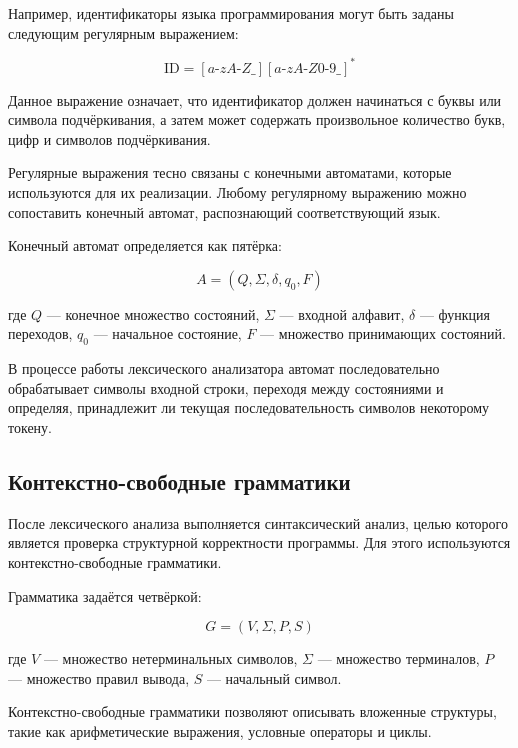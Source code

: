 \documentclass[coursework]{SCWorks}
\begin{document}
Например, идентификаторы языка программирования могут быть заданы следующим регулярным выражением:

\begin{equation}
\text{ID} = [a\text{-}zA\text{-}Z\_][a\text{-}zA\text{-}Z0\text{-}9\_]^*
\label{eq:id}
\end{equation}

Данное выражение означает, что идентификатор должен начинаться с буквы или символа подчёркивания, 
а затем может содержать произвольное количество букв, цифр и символов подчёркивания.

Регулярные выражения тесно связаны с конечными автоматами, которые используются для их реализации. 
Любому регулярному выражению можно сопоставить конечный автомат, распознающий соответствующий язык.

Конечный автомат определяется как пятёрка:

\begin{equation}
A = (Q, \Sigma, \delta, q_0, F)
\label{eq:automaton}
\end{equation}

где $Q$ — конечное множество состояний, $\Sigma$ — входной алфавит, 
$\delta$ — функция переходов, $q_0$ — начальное состояние, 
$F$ — множество принимающих состояний.

В процессе работы лексического анализатора автомат последовательно обрабатывает символы входной строки, 
переходя между состояниями и определяя, принадлежит ли текущая последовательность символов некоторому токену.

\subsection{Контекстно-свободные грамматики}

После лексического анализа выполняется синтаксический анализ, целью которого является проверка 
структурной корректности программы. Для этого используются контекстно-свободные грамматики.

Грамматика задаётся четвёркой:

\begin{equation}
G = (V, \Sigma, P, S)
\label{eq:grammar}
\end{equation}

где $V$ — множество нетерминальных символов, $\Sigma$ — множество терминалов, 
$P$ — множество правил вывода, $S$ — начальный символ.

Контекстно-свободные грамматики позволяют описывать вложенные структуры, такие как арифметические выражения, 
условные операторы и циклы.
\end{document}

